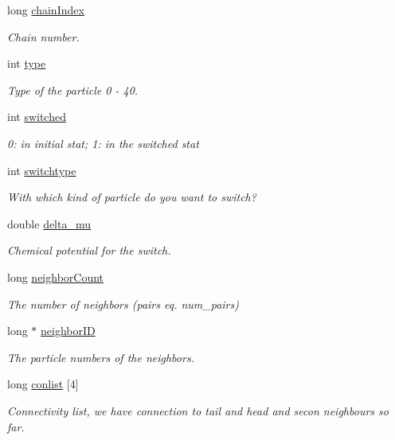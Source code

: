 \begin{DoxyCompactItemize}
long \hyperlink{class_particle_a9b75fd3fa9351d7d3fd7aa5a5170a809}{chain\+Index}
\begin{DoxyCompactList}\small\item\em Chain number. \end{DoxyCompactList}\item 
int \hyperlink{class_particle_a2b73dd42bcd56ba2e7ffeb0a5515a866}{type}
\begin{DoxyCompactList}\small\item\em Type of the particle 0 -\/ 40. \end{DoxyCompactList}\item 
int \hyperlink{class_particle_af14e7acdc74120025282ea901e11ef69}{switched}
\begin{DoxyCompactList}\small\item\em 0\+: in initial stat; 1\+: in the switched stat \end{DoxyCompactList}\item 
int \hyperlink{class_particle_ae44cd3609cd01ff2e66edc58c64de10e}{switchtype}
\begin{DoxyCompactList}\small\item\em With which kind of particle do you want to switch? \end{DoxyCompactList}\item 
double \hyperlink{class_particle_a14464961ee5c7acbcfebddb72156e1bd}{delta\+\_\+mu}
\begin{DoxyCompactList}\small\item\em Chemical potential for the switch. \end{DoxyCompactList}\item 
long \hyperlink{class_particle_a66f7e76a4292ea79499e062667a46409}{neighbor\+Count}
\begin{DoxyCompactList}\small\item\em The number of neighbors (pairs eq. num\+\_\+pairs) \end{DoxyCompactList}\item 
long $\ast$ \hyperlink{class_particle_a0d119c0ca1644995840d35b701afb566}{neighbor\+I\+D}
\begin{DoxyCompactList}\small\item\em The particle numbers of the neighbors. \end{DoxyCompactList}\item 
long \hyperlink{class_particle_aea82d73fc279e2b1d9d837e6a0873b30}{conlist} \mbox{[}4\mbox{]}
\begin{DoxyCompactList}\small\item\em Connectivity list, we have connection to tail and head and secon neighbours so far. \end{DoxyCompactList}\end{DoxyCompactItemize}


